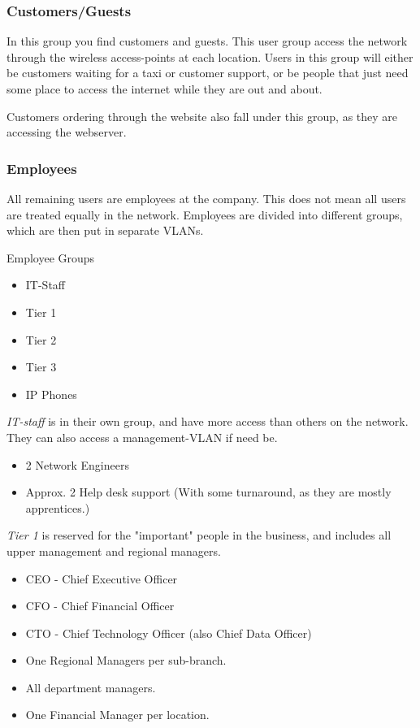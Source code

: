 \subsubsection{Customers/Guests}
In this group you find customers and guests. 
This user group access the network through the wireless access-points at each location.
Users in this group will either be customers waiting for a taxi or customer support, or be people that just need some place to access the internet while they are out and about.

Customers ordering through the website also fall under this group, as they are accessing the webserver.

\subsubsection{Employees}
All remaining users are employees at the company.
This does not mean all users are treated equally in the network. 
Employees are divided into different groups, which are then put in separate VLANs.

Employee Groups
\begin{itemize}[noitemsep] 
    \item IT-Staff
    \item Tier 1
    \item Tier 2
    \item Tier 3
    \item IP Phones
\end{itemize}
\hfill

\emph{IT-staff} is in their own group, and have more access than others on the network.
They can also access a management-VLAN if need be.
\begin{itemize}[noitemsep]
    \item 2 Network Engineers
    \item Approx. 2 Help desk support (With some turnaround, as they are mostly apprentices.)

\end{itemize}

\hfill

\emph{Tier 1} is reserved for the "important" people in the business, and includes all upper management and regional managers.
\begin{itemize}[noitemsep]
    \item CEO - Chief Executive Officer
    \item CFO - Chief Financial Officer
    \item CTO - Chief Technology Officer (also Chief Data Officer)
    \item One Regional Managers per sub-branch.
    \item All department managers.
    \item One Financial Manager per location.
\end{itemize}

